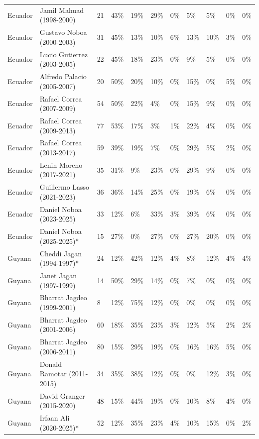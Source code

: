 \documentclass[11pt,a4paper]{article}
\begin{document}
\begin{longtable}{lllllllllll}
  Ecuador & Jamil Mahuad (1998-2000) & 21 & 43\% & 19\% & 29\% & 0\% & 5\% & 5\% & 0\% & 0\% \\ 
  Ecuador & Gustavo Noboa (2000-2003) & 31 & 45\% & 13\% & 10\% & 6\% & 13\% & 10\% & 3\% & 0\% \\ 
  Ecuador & Lucio Gutierrez (2003-2005) & 22 & 45\% & 18\% & 23\% & 0\% & 9\% & 5\% & 0\% & 0\% \\ 
  Ecuador & Alfredo Palacio (2005-2007) & 20 & 50\% & 20\% & 10\% & 0\% & 15\% & 0\% & 5\% & 0\% \\ 
  Ecuador & Rafael Correa (2007-2009) & 54 & 50\% & 22\% & 4\% & 0\% & 15\% & 9\% & 0\% & 0\% \\ 
  Ecuador & Rafael Correa (2009-2013) & 77 & 53\% & 17\% & 3\% & 1\% & 22\% & 4\% & 0\% & 0\% \\ 
  Ecuador & Rafael Correa (2013-2017) & 59 & 39\% & 19\% & 7\% & 0\% & 29\% & 5\% & 2\% & 0\% \\ 
  Ecuador & Lenin Moreno (2017-2021) & 35 & 31\% & 9\% & 23\% & 0\% & 29\% & 9\% & 0\% & 0\% \\ 
  Ecuador & Guillermo Lasso (2021-2023) & 36 & 36\% & 14\% & 25\% & 0\% & 19\% & 6\% & 0\% & 0\% \\ 
  Ecuador & Daniel Noboa (2023-2025) & 33 & 12\% & 6\% & 33\% & 3\% & 39\% & 6\% & 0\% & 0\% \\ 
  Ecuador & Daniel Noboa (2025-2025)* & 15 & 27\% & 0\% & 27\% & 0\% & 27\% & 20\% & 0\% & 0\% \\ 
  Guyana & Cheddi Jagan (1994-1997)* & 24 & 12\% & 42\% & 12\% & 4\% & 8\% & 12\% & 4\% & 4\% \\ 
  Guyana & Janet Jagan (1997-1999) & 14 & 50\% & 29\% & 14\% & 0\% & 7\% & 0\% & 0\% & 0\% \\ 
  Guyana & Bharrat Jagdeo (1999-2001) & 8 & 12\% & 75\% & 12\% & 0\% & 0\% & 0\% & 0\% & 0\% \\ 
  Guyana & Bharrat Jagdeo (2001-2006) & 60 & 18\% & 35\% & 23\% & 3\% & 12\% & 5\% & 2\% & 2\% \\ 
  Guyana & Bharrat Jagdeo (2006-2011) & 80 & 15\% & 29\% & 19\% & 0\% & 16\% & 16\% & 5\% & 0\% \\ 
  Guyana & Donald Ramotar (2011-2015) & 34 & 35\% & 38\% & 12\% & 0\% & 0\% & 12\% & 3\% & 0\% \\ 
  Guyana & David Granger (2015-2020) & 48 & 15\% & 44\% & 19\% & 0\% & 10\% & 8\% & 4\% & 0\% \\ 
  Guyana & Irfaan Ali (2020-2025)* & 52 & 12\% & 35\% & 23\% & 4\% & 10\% & 15\% & 0\% & 2\% \\ 

\end{longtable}
\end{document}
